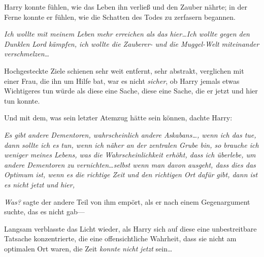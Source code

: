 Harry konnte fühlen, wie das Leben ihn verließ und den Zauber nährte; in der Ferne konnte er fühlen, wie die Schatten des Todes zu zerfasern begannen.

\emph{Ich wollte mit meinem Leben mehr erreichen als das hier…Ich wollte gegen den Dunklen Lord kämpfen, ich wollte die Zauberer- und die Muggel-Welt miteinander verschmelzen…}

Hochgesteckte Ziele schienen sehr weit entfernt, sehr abstrakt, verglichen mit einer Frau, die ihn um Hilfe bat, war es nicht \emph{sicher}, ob Harry jemals etwas Wichtigeres tun würde als diese eine Sache, diese eine Sache, die er jetzt und hier tun konnte.

Und mit dem, was sein letzter Atemzug hätte sein können, dachte Harry:

\emph{Es gibt andere Dementoren, wahrscheinlich andere Askabans…, wenn ich das tue, dann sollte ich es tun, wenn ich näher an der zentralen Grube bin, so brauche ich weniger meines Lebens, was die Wahrscheinlichkeit erhöht, dass ich überlebe, um andere Dementoren zu vernichten…selbst wenn man davon ausgeht, dass dies das Optimum ist, wenn es die richtige Zeit und den richtigen Ort dafür gibt, dann ist es nicht jetzt und hier, }

\emph{Was?} sagte der andere Teil von ihm empört, als er nach einem Gegenargument suchte, das es nicht gab—

Langsam verblasste das Licht wieder, als Harry sich auf diese eine unbestreitbare Tatsache konzentrierte, die eine offensichtliche Wahrheit, dass sie nicht am optimalen Ort waren, die Zeit \emph{konnte} \emph{nicht} \emph{jetzt} sein…

